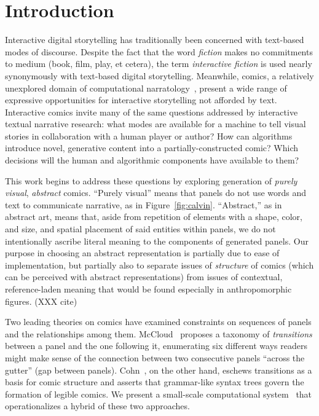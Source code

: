\section{Introduction}

Interactive digital storytelling has traditionally been concerned with
text-based modes of discourse. Despite the fact that the word {\em fiction}
makes no commitments to medium (book, film, play, et cetera), the term {\em
interactive fiction} is used nearly synonymously with text-based digital
storytelling. Meanwhile, comics, a relatively unexplored domain of
computational narratology~\cite{mani2012computational}, present a wide
range of expressive opportunities for interactive storytelling not afforded
by text.  Interactive comics invite many of the same questions addressed by
interactive textual narrative research: what modes are available for a
machine to tell visual stories in collaboration with a human player or
author? How can algorithms introduce novel, generative content into a
partially-constructed comic?  Which decisions will the human and
algorithmic components have available to them?

This work begins to address these questions by exploring generation of {\em
purely visual}, {\em abstract} comics. ``Purely visual'' means that panels
do not use words and text to communicate narrative, as in
Figure~\ref{fig:calvin}. ``Abstract,'' as in abstract art, means that,
aside from repetition of elements with a shape, color, and size, and
spatial placement of said entities within panels, we do not intentionally
ascribe literal meaning to the components of generated panels. Our purpose
in choosing an abstract representation is partially due to ease of
implementation, but partially also to separate issues of {\em structure} of
comics (which can be perceived with abstract representations) from issues
of contextual, reference-laden meaning that would be found especially in
anthropomorphic figures. (XXX cite)


Two leading theories on comics have examined constraints on sequences of panels
and the relationships among them.
McCloud~\cite{mcCloud1993understanding} proposes a taxonomy of {\em
transitions} between a panel and the one following it, enumerating six
different ways readers might make sense of the connection between two
consecutive panels ``across the gutter'' (gap between panels).
Cohn~\cite{cohn2013visual}, on the other hand, eschews transitions as a
basis for comic structure and asserts that grammar-like syntax trees govern
the formation of legible comics.
We present a small-scale computational
system~\cite{montfort2012small} that operationalizes a hybrid of these two
approaches.


